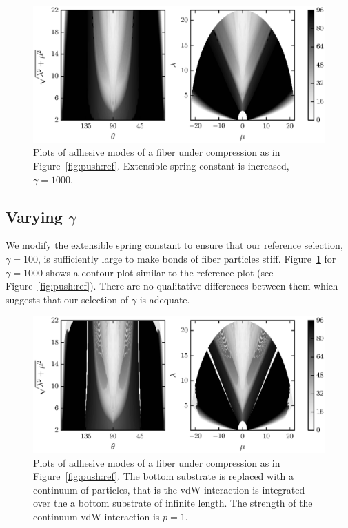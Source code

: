 {	\begin{figure}[t]
		\begin{center}
			\includegraphics{./fig/ch3/push/g1000/grid.eps}
		\end{center}		
		\caption{Plots of adhesive modes of a fiber under compression as in Figure~\ref{fig:push:ref}. Extensible spring constant is increased, $\gamma=1000$.
		\label{fig:push:g1000}}
	\end{figure}	

\subsection{Varying $\gamma$}

We modify the extensible spring constant to ensure that our reference selection, $\gamma=100$, is sufficiently large to make bonds of fiber particles stiff. Figure~\ref{fig:push:g1000} for $\gamma=1000$ shows a contour plot similar to the reference plot (see Figure~\ref{fig:push:ref}). There are no qualitative differences between them which suggests that our selection of $\gamma$ is adequate.

	\begin{figure}[t]
		\begin{center}
			\includegraphics{./fig/ch3/push/p1/grid.eps}
		\end{center}		
		\caption{Plots of adhesive modes of a fiber under compression as in Figure~\ref{fig:push:ref}. The bottom substrate is replaced with a continuum of particles, that is the vdW interaction is integrated over the a bottom substrate of infinite length. The strength of the continuum vdW interaction is $p=1$.
		\label{fig:push:p1}}
	\end{figure}

}
